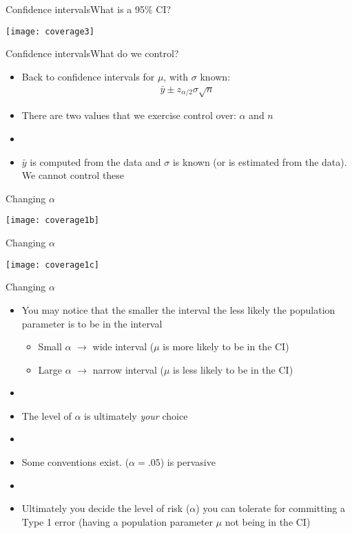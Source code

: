 \documentclass[xcolor=dvipsnames]{beamer}
\begin{document}
\begin{frame}{Confidence intervals}{What is a 95\% CI?}
\begin{center}
	\texttt{[image: coverage3]}
\end{center}
\end{frame}

\begin{frame}{Confidence intervals}{What do we control?}
\begin{itemize}
	\item Back to confidence intervals for $\mu$, with $\sigma$ known:
	\begin{gather*}
	\bar{y}\pm z_{\alpha/2} \sigma \sqrt{n}
	\end{gather*}  \pause
	\item There are two values that we exercise control over: $\alpha$ and $n$  \pause
	\item[]
	\item $\bar{y}$ is computed from the data and $\sigma$ is known (or is estimated from the data). We cannot control these
\end{itemize}
\end{frame}

\begin{frame}{Changing $\alpha$}
	\begin{center}
			\texttt{[image: coverage1b]}
	\end{center}
\end{frame}

\begin{frame}{Changing $\alpha$}
\begin{center}
	\texttt{[image: coverage1c]}
\end{center}
\end{frame}

\begin{frame}{Changing $\alpha$}
\begin{itemize}
	\item You may notice that the smaller the interval the less likely the population parameter is to be in the interval  \pause
	\begin{itemize}
		\item Small $\alpha$ $\rightarrow$ wide interval ($\mu$ is more likely to be in the CI)  \pause
		\item Large $\alpha$ $\rightarrow$ narrow interval ($\mu$ is less likely to be in the CI)  \pause
	\end{itemize}
	\item[]
	\item The level of $\alpha$ is ultimately \emph{your} choice  \pause
	\item[]
	\item Some conventions exist. ($\alpha = .05$) is pervasive  \pause
	\item[]
	\item Ultimately you decide the level of risk ($\alpha$) you can tolerate for committing a Type 1 error (having a population parameter $\mu$ not being in the CI)
\end{itemize}
\end{frame}
\end{document}
